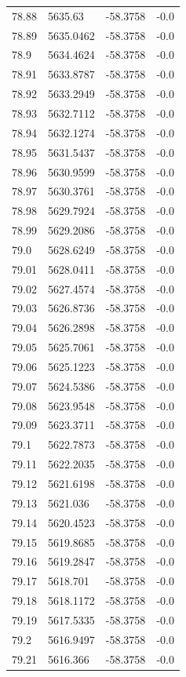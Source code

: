\begin{table}[H]
\begin{tabular}{llll}
78.88 & 5635.63 & -58.3758 & -0.0 \\
78.89 & 5635.0462 & -58.3758 & -0.0 \\
78.9 & 5634.4624 & -58.3758 & -0.0 \\
78.91 & 5633.8787 & -58.3758 & -0.0 \\
78.92 & 5633.2949 & -58.3758 & -0.0 \\
78.93 & 5632.7112 & -58.3758 & -0.0 \\
78.94 & 5632.1274 & -58.3758 & -0.0 \\
78.95 & 5631.5437 & -58.3758 & -0.0 \\
78.96 & 5630.9599 & -58.3758 & -0.0 \\
78.97 & 5630.3761 & -58.3758 & -0.0 \\
78.98 & 5629.7924 & -58.3758 & -0.0 \\
78.99 & 5629.2086 & -58.3758 & -0.0 \\
79.0 & 5628.6249 & -58.3758 & -0.0 \\
79.01 & 5628.0411 & -58.3758 & -0.0 \\
79.02 & 5627.4574 & -58.3758 & -0.0 \\
79.03 & 5626.8736 & -58.3758 & -0.0 \\
79.04 & 5626.2898 & -58.3758 & -0.0 \\
79.05 & 5625.7061 & -58.3758 & -0.0 \\
79.06 & 5625.1223 & -58.3758 & -0.0 \\
79.07 & 5624.5386 & -58.3758 & -0.0 \\
79.08 & 5623.9548 & -58.3758 & -0.0 \\
79.09 & 5623.3711 & -58.3758 & -0.0 \\
79.1 & 5622.7873 & -58.3758 & -0.0 \\
79.11 & 5622.2035 & -58.3758 & -0.0 \\
79.12 & 5621.6198 & -58.3758 & -0.0 \\
79.13 & 5621.036 & -58.3758 & -0.0 \\
79.14 & 5620.4523 & -58.3758 & -0.0 \\
79.15 & 5619.8685 & -58.3758 & -0.0 \\
79.16 & 5619.2847 & -58.3758 & -0.0 \\
79.17 & 5618.701 & -58.3758 & -0.0 \\
79.18 & 5618.1172 & -58.3758 & -0.0 \\
79.19 & 5617.5335 & -58.3758 & -0.0 \\
79.2 & 5616.9497 & -58.3758 & -0.0 \\
79.21 & 5616.366 & -58.3758 & -0.0 \\

\end{tabular}
\end{table}
